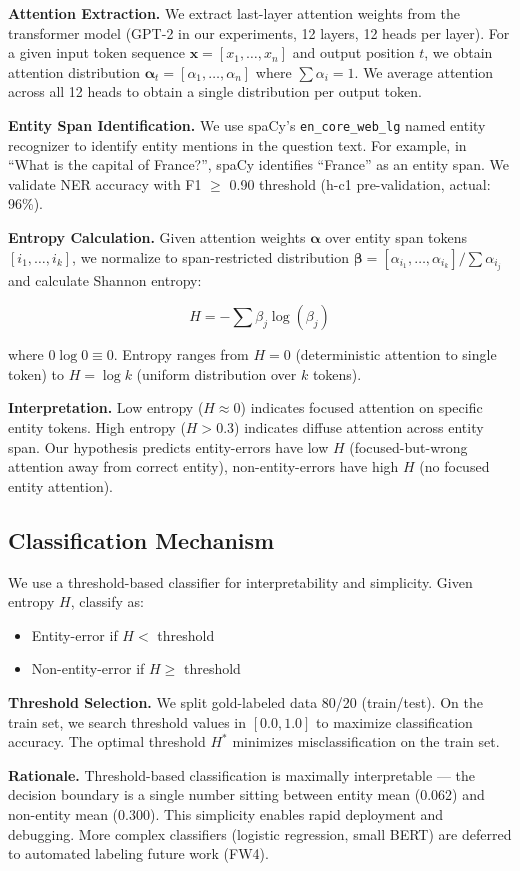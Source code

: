 \textbf{Attention Extraction.} We extract last-layer attention weights from the transformer model (GPT-2 in our experiments, 12 layers, 12 heads per layer). For a given input token sequence $\mathbf{x} = [x_1, \ldots, x_n]$ and output position $t$, we obtain attention distribution $\bm{\alpha}_t = [\alpha_1, \ldots, \alpha_n]$ where $\sum \alpha_i = 1$. We average attention across all 12 heads to obtain a single distribution per output token.

\textbf{Entity Span Identification.} We use spaCy's \texttt{en\_core\_web\_lg} named entity recognizer to identify entity mentions in the question text. For example, in ``What is the capital of France?'', spaCy identifies ``France'' as an entity span. We validate NER accuracy with F1 $\geq$ 0.90 threshold (h-c1 pre-validation, actual: 96\%).

\textbf{Entropy Calculation.} Given attention weights $\bm{\alpha}$ over entity span tokens $[i_1, \ldots, i_k]$, we normalize to span-restricted distribution $\bm{\beta} = [\alpha_{i_1}, \ldots, \alpha_{i_k}] / \sum \alpha_{i_j}$ and calculate Shannon entropy:

\[
H = -\sum \beta_j \log(\beta_j)
\]

where $0 \log 0 \equiv 0$. Entropy ranges from $H = 0$ (deterministic attention to single token) to $H = \log k$ (uniform distribution over $k$ tokens).

\textbf{Interpretation.} Low entropy ($H \approx 0$) indicates focused attention on specific entity tokens. High entropy ($H > 0.3$) indicates diffuse attention across entity span. Our hypothesis predicts entity-errors have low $H$ (focused-but-wrong attention away from correct entity), non-entity-errors have high $H$ (no focused entity attention).

\subsection{Classification Mechanism}

We use a threshold-based classifier for interpretability and simplicity. Given entropy $H$, classify as:

\begin{itemize}
\item Entity-error if $H <$ threshold
\item Non-entity-error if $H \geq$ threshold
\end{itemize}

\textbf{Threshold Selection.} We split gold-labeled data 80/20 (train/test). On the train set, we search threshold values in $[0.0, 1.0]$ to maximize classification accuracy. The optimal threshold $H^*$ minimizes misclassification on the train set.

\textbf{Rationale.} Threshold-based classification is maximally interpretable --- the decision boundary is a single number sitting between entity mean (0.062) and non-entity mean (0.300). This simplicity enables rapid deployment and debugging. More complex classifiers (logistic regression, small BERT) are deferred to automated labeling future work (FW4).
